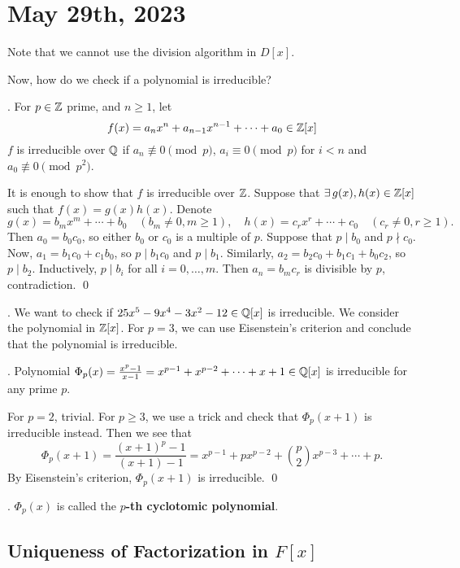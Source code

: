 \section*{May 29th, 2023}

Note that we cannot use the division algorithm in \(D[x]\).

Now, how do we check if a polynomial is irreducible?

\thm.  For \(p \in \mathbb{Z}\) prime, and \(n \geq 1\), let
\[
    f(x) = a_n x^n + a_{n-1}x^{n-1} + \cdots + a_0 \in \mathbb{Z}[x]
\]
\(f\) is irreducible over \(\mathbb{Q}\) if \(a_n \not\equiv 0 \pmod p\), \(a_i \equiv 0 \pmod p\) for \(i < n\) and \(a_0 \not\equiv 0 \pmod {p^2}\).

\pf It is enough to show that \(f\) is irreducible over \(\mathbb{Z}\). Suppose that \(\exists g(x), h(x) \in \Z[x]\) such that \(f(x) = g(x)h(x)\). Denote
\[
    g(x) = b_m x^m + \cdots + b_0 \quad (b_m \neq 0, m\geq 1), \quad h(x) = c_r x^r + \cdots + c_0 \quad (c_r \neq 0, r \geq 1).
\]
Then \(a_0 = b_0 c_0\), so either \(b_0\) or \(c_0\) is a multiple of \(p\). Suppose that \(p \mid b_0\) and \(p \nmid c_0\). Now, \(a_1 = b_1c_0 + c_1b_0\), so \(p \mid b_1c_0\) and \(p \mid b_1\). Similarly, \(a_2 = b_2c_0 + b_1c_1 + b_0c_2\), so \(p \mid b_2\). Inductively, \(p \mid b_i\) for all \(i = 0, \dots, m\). Then \(a_n = b_m c_r\) is divisible by \(p\), contradiction. \qed

\ex. We want to check if \(25x^5 - 9x^4 - 3x^2 - 12 \in \mathbb{Q}[x]\) is irreducible. We consider the polynomial in \(\mathbb{Z}[x]\). For \(p = 3\), we can use Eisenstein's criterion and conclude that the polynomial is irreducible.

\cor. Polynomial \(\Phi_p(x) = \frac{x^p - 1}{x - 1} = x^{p - 1} + x^{p - 2} + \cdots + x + 1 \in \mathbb{Q}[x]\) is irreducible for any prime \(p\).

\pf For \(p = 2\), trivial. For \(p \geq 3\), we use a trick and check that \(\Phi_p(x+1)\) is irreducible instead. Then we see that
\[
    \Phi_p(x + 1) = \frac{(x+1)^p - 1}{(x + 1) - 1} = x^{p-1} + p x^{p-2} + {p \choose 2} x^{p-3} + \cdots + p.
\]
By Eisenstein's criterion, \(\Phi_p(x + 1)\) is irreducible. \qed

.  \(\Phi_p(x)\) is called the \textbf{\(p\)-th cyclotomic polynomial}.

\pagebreak

\subsection*{Uniqueness of Factorization in \(F[x]\)}

